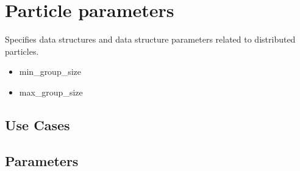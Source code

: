 \section{Particle parameters} \label{s:data}

Specifies data structures and data structure parameters related
to distributed particles.  

\begin{itemize}
\item min\_group\_size
\item max\_group\_size
\end{itemize}

\subsection{Use Cases}
\subsection{Parameters}
